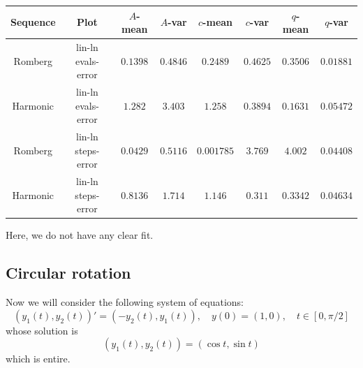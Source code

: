 \begin{table}[H]
    \centering
    \small
     \begin{tabular}{c|c||c|c|c|c|c|c}
Sequence & Plot & \(A\)-mean & \(A\)-var & \(c\)-mean & \(c\)-var & \(q\)-mean & \(q\)-var\\\hline
Romberg & lin-ln evals-error & \(0.1398\) & \(0.4846\) & \(0.2489\) & \(0.4625\) & \(0.3506\) & \(0.01881\) \\
Harmonic & lin-ln evals-error & \(1.282\) & \(3.403\) & \(1.258\) & \(0.3894\) & \(0.1631\) & \(0.05472\) \\
Romberg & lin-ln steps-error & \(0.0429\) & \(0.5116\) & \(0.001785\) & \(3.769\) & \(4.002\) & \(0.04408\) \\
Harmonic & lin-ln steps-error & \(0.8136\) & \(1.714\) & \(1.146\) & \(0.311\) & \(0.3342\) & \(0.04634\) \\
    \end{tabular}
    \label{tab:my_label}
\end{table}

Here, we do not have any clear fit.

\subsection{Circular rotation}

Now we will consider the following system of equations:
\begin{equation}\label{48}
(y_1(t),y_2(t))' = (-y_2(t), y_1(t)), \quad y(0) = (1,0), \quad t\in [0,\pi /2]
\end{equation}
whose solution is 
\[
(y_1(t),y_2(t)) = (\cos t, \sin t)
\]
which is entire.

